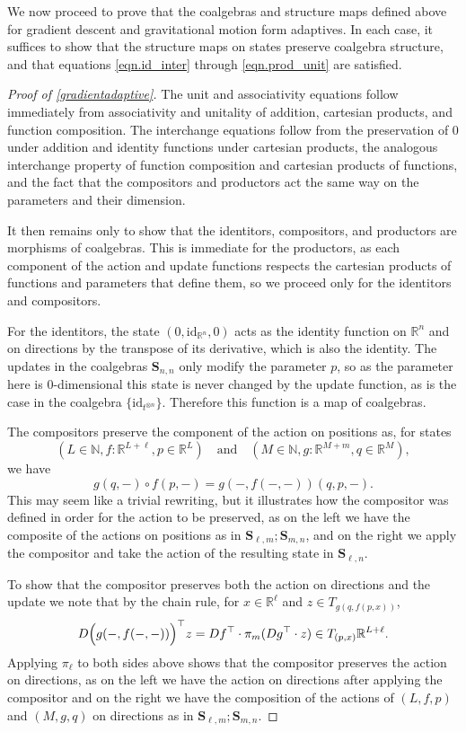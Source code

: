 \documentclass[11pt, one side, article]{memoir}
\theoremstyle{definition}
\theoremstyle{plain}
\newcommand{\Cat}[1]{\mathbf{#1}}%
\newcommand{\id}{\mathrm{id}}
\newcommand{\nn}{\mathbb{N}}
\newcommand{\rr}{\mathbb{R}}
\newcommand{\0}{\textsf{0}}
\newcommand{\1}{\tn{\textsf{1}}}
\renewcommand{\S}{{\Cat{S}}}
\newcommand{\blp}{\Big{(}}
\newcommand{\brp}{\Big{)}}
\newcommand{\idcoalg}[1]{{\{\id_{#1}\}}}
\begin{document}
We now proceed to prove that the coalgebras and structure maps defined above for gradient descent and gravitational motion form adaptives. In each case, it suffices to show that the structure maps on states preserve coalgebra structure, and that equations \eqref{eqn.id_inter} through \eqref{eqn.prod_unit} are satisfied.

\begin{proof}[Proof of \cref{gradientadaptive}]
The unit and associativity equations follow immediately from associativity and unitality of addition, cartesian products, and function composition. The interchange equations follow from the preservation of 0 under addition and identity functions under cartesian products, the analogous interchange property of function composition and cartesian products of functions, and the fact that the compositors and productors act the same way on the parameters and their dimension. 

It then remains only to show that the identitors, compositors, and productors are morphisms of coalgebras. This is immediate for the productors, as each component of the action and update functions respects the cartesian products of functions and parameters that define them, so we proceed only for the identitors and compositors.

For the identitors, the state $(0,\id_{\rr^n},0)$ acts as the identity function on $\rr^n$ and on directions by the transpose of its derivative, which is also the identity. The updates in the coalgebras $\S_{n,n}$ only modify the parameter $p$, so as the parameter here is 0-dimensional this state is never changed by the update function, as is the case in the coalgebra $\idcoalg{t^{\otimes n}}$. Therefore this function is a map of coalgebras.

The compositors preserve the component of the action on positions as, for states 
$$(L \in \nn, f : \rr^{L+\ell}, p \in \rr^L) \quad \textrm{and} \quad (M \in \nn, g : \rr^{M+m}, q \in \rr^M),$$ 
we have 
$$g(q,-) \circ f(p,-) = g(-,f(-,-))(q,p,-).$$
This may seem like a trivial rewriting, but it illustrates how the compositor was defined in order for the action to be preserved, as on the left we have the composite of the actions on positions as in $\S_{\ell,m};\S_{m,n}$, and on the right we apply the compositor and take the action of the resulting state in $\S_{\ell,n}$.

To show that the compositor preserves both the action on directions and the update we note that by the chain rule, for $x \in \rr^\ell$ and $z \in T_{g(q,f(p,x))}$,
$$D\blp g(-,f(-,-)) \brp^\top z = Df^\top \cdot \pi_m(Dg^\top \cdot z) \in T_{(p,x)}\rr^{L+\ell}.$$
Applying $\pi_\ell$ to both sides above shows that the compositor preserves the action on directions, as on the left we have the action on directions after applying the compositor and on the right we have the composition of the actions of $(L,f,p)$ and $(M,g,q)$ on directions as in $\S_{\ell,m};\S_{m,n}$.


\end{proof}
\end{document}
